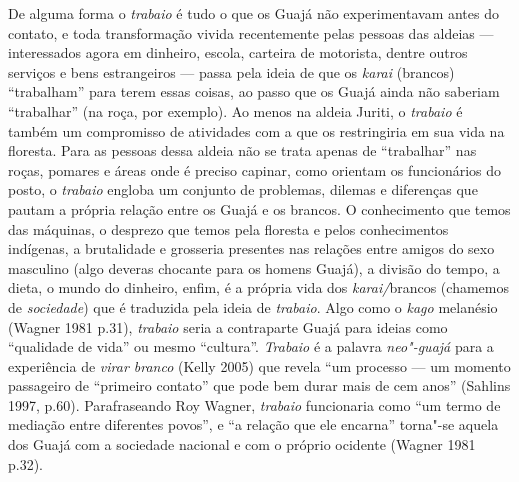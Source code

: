 De alguma forma o \emph{trabaio} é tudo o que os Guajá não
experimentavam antes do contato, e toda transformação vivida
recentemente pelas pessoas das aldeias --- interessados agora em dinheiro,
escola, carteira de motorista, dentre outros serviços e bens
estrangeiros --- passa pela ideia de que os \emph{karai} (brancos)
``trabalham'' para terem essas coisas, ao passo que os Guajá ainda não
saberiam ``trabalhar'' (na roça, por exemplo). Ao menos na aldeia
Juriti, o \emph{trabaio} é também um compromisso de atividades com a
 que os restringiria em sua vida na floresta. Para as pessoas dessa
aldeia não se trata apenas de ``trabalhar'' nas roças, pomares e áreas
onde é preciso capinar, como orientam os funcionários do posto, o
\emph{trabaio} engloba um conjunto de problemas, dilemas e diferenças
que pautam a própria relação entre os Guajá e os brancos. O conhecimento
que temos das máquinas, o desprezo que temos pela floresta e pelos
conhecimentos indígenas, a brutalidade e grosseria presentes nas
relações entre amigos do sexo masculino (algo deveras chocante para os
homens Guajá), a divisão do tempo, a dieta, o mundo do dinheiro, enfim,
é a própria vida dos \emph{karai/}brancos (chamemos de \emph{sociedade})
que é traduzida pela ideia de \emph{trabaio}. Algo como o \emph{kago}
melanésio (Wagner 1981 p.31), \emph{trabaio} seria a contraparte Guajá
para ideias como ``qualidade de vida'' ou mesmo ``cultura''.
\emph{Trabaio} é a palavra \emph{neo"-guajá} para a experiência de
\emph{virar branco} (Kelly 2005) que revela ``um processo --- um momento
passageiro de ``primeiro contato'' que pode bem durar mais de cem anos''
(Sahlins 1997, p.60). Parafraseando Roy Wagner, \emph{trabaio}
funcionaria como ``um termo de mediação entre diferentes povos'', e ``a
relação que ele encarna'' torna"-se aquela dos Guajá com a sociedade
nacional e com o próprio ocidente (Wagner 1981 p.32).
